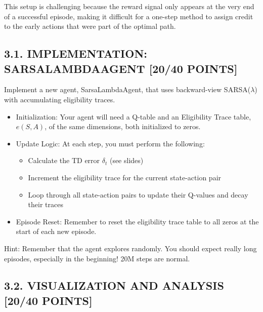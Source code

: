 \documentclass{article}
\begin{document}
This setup is challenging because the reward signal only appears at the very end of a successful episode, making it difficult for a one-step method to assign credit to the early actions that were part of the optimal path.

\subsection{3.1. IMPLEMENTATION: SARSALAMBDAAGENT [20/40 POINTS]}

Implement a new agent, SarsaLambdaAgent, that uses backward-view SARSA($\lambda$) with accumulating eligibility traces.

\begin{itemize}
    \item Initialization: Your agent will need a Q-table and an Eligibility Trace table, $e(S, A)$, of the same dimensions, both initialized to zeros.
    \item Update Logic: At each step, you must perform the following:
    \begin{itemize}
        \item Calculate the TD error $\delta_t$ (see slides)
        \item Increment the eligibility trace for the current state-action pair
        \item Loop through all state-action pairs to update their Q-values and decay their traces
    \end{itemize}
    \item Episode Reset: Remember to reset the eligibility trace table to all zeros at the start of each new episode.
\end{itemize}

Hint: Remember that the agent explores randomly. You should expect really long episodes, especially in the beginning! 20M steps are normal.


\subsection{3.2. VISUALIZATION AND ANALYSIS [20/40 POINTS]}
\end{document}
